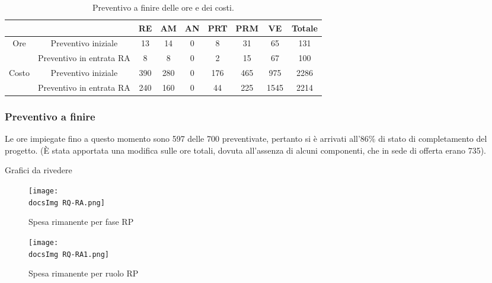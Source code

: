 {{\begin{table}[h!]
\begin{center}
\begin{tabular}{c| c c c c c c c |c }
				\toprule
				\multicolumn{2}{c}{}&	RE& AM& AN& PRT& PRM& VE& Totale \\ 
				\midrule
				\multirow{2}{*}{Ore}	& Preventivo iniziale	& 13& 14& 0&  8& 31 & 65	& 131\\ 
							& Preventivo in entrata RA & 8 	& 8 	& 0	& 2 & 15 & 67	& 100\\ \hline
				\multirow{2}{*}{Costo}	& Preventivo iniziale	& 390	& 280	& 0 	& 176 	& 465 	& 975 & 2286\\ 
							& Preventivo in entrata RA & 240	& 160 & 0 &  44 	& 225	& 1545	& 2214\\
				\bottomrule
			\end{tabular}
		\end{center}
		\caption{Preventivo a finire delle ore e dei costi.}
	\end{table}
	
		\subsubsection{Preventivo a finire}
	Le ore impiegate fino a questo momento sono 597 delle 700 preventivate, pertanto si è arrivati all'86\% di stato di completamento del progetto. (È  stata apportata una modifica sulle ore totali, dovuta all'assenza di alcuni componenti,  che in sede di offerta erano 735). 
	
	Grafici da rivedere
	\begin{figure}[h!]
	\centering
		\texttt{[image: \\docsImg RQ-RA.png]}
		\caption{Spesa rimanente per fase RP}  	
	\end{figure}
		 	\begin{figure}[h!]
	\centering
		\texttt{[image: \\docsImg RQ-RA1.png]}
		\caption{Spesa rimanente per ruolo RP} 
	
	\end{figure}
	}
	

}